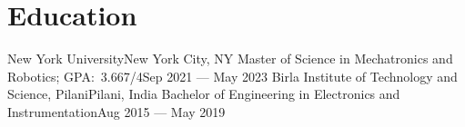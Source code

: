 \section{Education}
  \resumeSubHeadingListStart
    \resumeSubheading
      {New York University}{New York City, NY}
      {Master of Science in Mechatronics and Robotics;  GPA:\ 3.667/4}{Sep 2021 --- May 2023}
    \resumeSubheading
      {Birla Institute of Technology and Science, Pilani}{Pilani, India}
      {Bachelor of Engineering in Electronics and Instrumentation}{Aug 2015 --- May 2019}
  \resumeSubHeadingListEnd